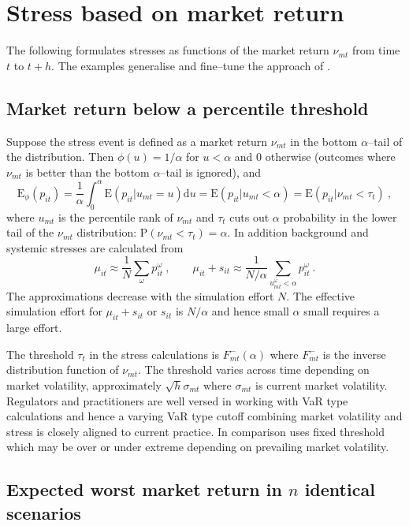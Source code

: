 \documentclass[12pt]{article}
\newcommand{\E}{\mathrm{E}}
\newcommand{\p}{\mathrm{P}}
\renewcommand{\o}{\omega}
\newcommand{\Es}{\E_\phi}
\newcommand{\de}{\mathrm{d}}
\newcommand{\cq}{\ , \qquad}
\begin{document}
\section{Stress based on  market return}\label{marketstress}


The following formulates stresses as functions of the market return $\nu_{mt}$ from time $t$ to $t+h$. The examples generalise and fine--tune the approach of \cite{brownlees2015}.

\subsection{Market return below a percentile threshold}

Suppose the stress event is defined as a market return $\nu_{mt}$ in the bottom $\alpha$--tail of the distribution.   Then  $\phi(u)=1/\alpha$ for $u< \alpha$ and 0 otherwise (outcomes where $\nu_{mt}$ is better than the bottom $\alpha$--tail is ignored), and
$$
\Es(p_{it}) = \frac{1}{\alpha}\int_0^\alpha\E(p_{it}|u_{mt}=u)\de u = \E(p_{it}|u_{mt}<\alpha) = \E(p_{it}|\nu_{mt}<\tau_{t}) \ ,
$$
where $u_{mt}$ is the percentile rank of $\nu_{mt}$ and $\tau_t$ cuts out $\alpha$ probability in the lower tail of the $\nu_{mt}$ distribution: $\p(\nu_{mt}<\tau_t)=\alpha$. In addition background and systemic stresses are calculated from
$$
\mu_{it}\approx \frac{1}{N} \sum_\o p_{it}^\o \cq  \mu_{it}+s_{it}   \approx  \frac{1}{N/\alpha} \sum_{u^\o_{mt}<\alpha}  p_{it}^\o\ .
$$
The approximations decrease with the simulation effort $N$.   The effective simulation effort for $\mu_{it}+s_{it}$ or $s_{it}$ is $N/\alpha$ and hence small $\alpha$ small requires a large effort.

The threshold $\tau_t$ in the stress calculations is $F_{mt}^-(\alpha)$ where $F_{mt}^-$ is the inverse distribution function of $\nu_{mt}$. The threshold varies across time depending on market volatility, approximately $\sqrt{h}\sigma_{mt}$ where $\sigma_{mt}$ is current market volatility.   Regulators and practitioners  are well versed in working with VaR type calculations and hence a varying VaR type cutoff combining market volatility and stress is closely aligned to current practice. In comparison \cite{brownlees2015} uses fixed threshold which may be over or under extreme depending on prevailing market volatility.


\subsection{Expected worst market return in $n$ identical scenarios}
\end{document}
